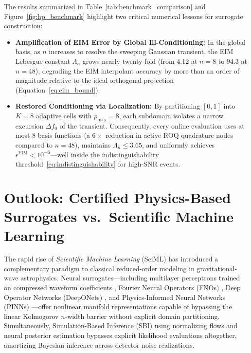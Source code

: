 \documentclass[11pt, a4paper]{article}
\begin{document}
The results summarized in Table~\ref{tab:benchmark_comparison} and Figure~\ref{fig:hp_benchmark} highlight two critical numerical lessons for surrogate construction:
\begin{itemize}
    \item \textbf{Amplification of EIM Error by Global Ill-Conditioning:} In the global basis, as $n$ increases to resolve the sweeping Gaussian transient, the EIM Lebesgue constant $\Lambda_n$ grows nearly twenty-fold (from $4.12$ at $n=8$ to $94.3$ at $n=48$), degrading the EIM interpolant accuracy by more than an order of magnitude relative to the ideal orthogonal projection (Equation~\eqref{eq:eim_bound}).
    \item \textbf{Restored Conditioning via Localization:} By partitioning $[0,1]$ into $K=8$ adaptive cells with $p_{\max} = 8$, each subdomain isolates a narrow excursion $\Delta f_0$ of the transient. Consequently, every online evaluation uses at most $8$ basis functions (a $6\times$ reduction in active ROQ quadrature nodes compared to $n=48$), maintains $\Lambda_n \le 3.65$, and uniformly achieves $\epsilon^{\mathrm{EIM}} < 10^{-6}$---well inside the indistinguishability threshold~\eqref{eq:indistinguishability} for high-SNR events.
\end{itemize}

\section{Outlook: Certified Physics-Based Surrogates vs.\ Scientific Machine Learning}
\label{sec:outlook_sciml}

The rapid rise of \emph{Scientific Machine Learning} (SciML) has introduced a complementary paradigm to classical reduced-order modeling in gravitational-wave astrophysics. Neural surrogates---including multilayer perceptrons trained on compressed waveform coefficients \cite{Khan2021,Thomas2022}, Fourier Neural Operators (FNOs) \cite{Li2021}, Deep Operator Networks (DeepONets) \cite{Lu2021}, and Physics-Informed Neural Networks (PINNs) \cite{Raissi2019}---offer nonlinear manifold representations capable of bypassing the linear Kolmogorov $n$-width barrier without explicit domain partitioning. Simultaneously, Simulation-Based Inference (SBI) using normalizing flows and neural posterior estimation \cite{Dax2021,Dax2023} bypasses explicit likelihood evaluations altogether, amortizing Bayesian inference across detector noise realizations.
\end{document}
